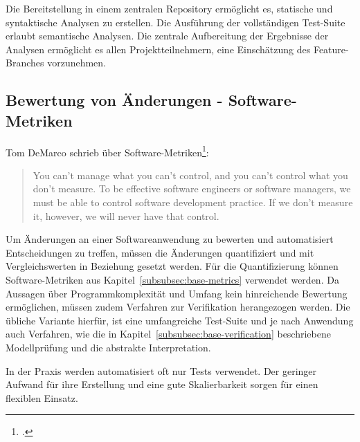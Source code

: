 Die Bereitstellung in einem zentralen Repository ermöglicht es, statische und syntaktische Analysen zu erstellen. Die Ausführung der vollständigen Test-Suite erlaubt semantische Analysen. Die zentrale Aufbereitung der Ergebnisse der Analysen ermöglicht es allen Projektteilnehmern, eine Einschätzung des Feature-Branches vorzunehmen.

\subsection{Bewertung von Änderungen - Software-Metriken}
\label{subsec:main-metrics}

Tom DeMarco schrieb über Software-Metriken\footcite{demarco1986}:

\blockquote{You can’t manage what you can’t control, and you can’t control what you
don’t measure. To be effective software engineers or software managers, we
must be able to control software development practice. If we don’t measure
it, however, we will never have that control.}

Um Änderungen an einer Softwareanwendung zu bewerten und automatisiert Entscheidungen zu treffen, müssen die Änderungen quantifiziert und mit Vergleichswerten in Beziehung gesetzt werden. Für die Quantifizierung können Software-Metriken aus  Kapitel~\ref{subsubsec:base-metrics} verwendet werden. Da Aussagen über Programmkomplexität und Umfang kein hinreichende Bewertung ermöglichen, müssen zudem Verfahren zur Verifikation herangezogen werden. Die übliche Variante hierfür, ist eine umfangreiche Test-Suite und je nach Anwendung auch Verfahren, wie die in Kapitel~\ref{subsubsec:base-verification} beschriebene Modellprüfung und die abstrakte Interpretation.

In der Praxis werden automatisiert oft nur Tests verwendet. Der geringer Aufwand für ihre Erstellung und eine gute Skalierbarkeit sorgen für einen flexiblen Einsatz. 

